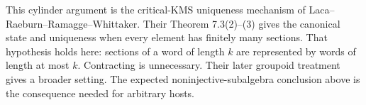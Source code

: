 This cylinder argument is the critical-KMS uniqueness mechanism of Laca--Raeburn--Ramagge--Whittaker. Their Theorem 7.3(2)--(3) \cite{LRRW} gives the canonical state and uniqueness when every element has finitely many sections. That hypothesis holds here: sections of a word of length $k$ are represented by words of length at most $k$. Contracting is unnecessary. Their later groupoid treatment \cite{LRRWGroupoid} gives a broader setting. The expected noninjective-subalgebra conclusion above is the consequence needed for arbitrary hosts.
